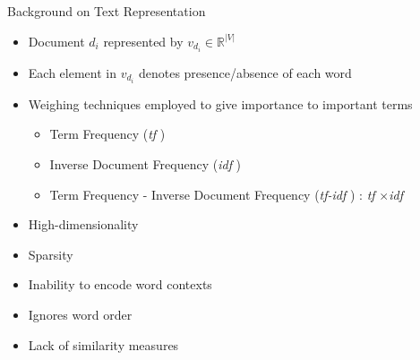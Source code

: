 \documentclass[10pt]{beamer}
\newcommand{\todo}[1]{\textcolor{red}{\textbf{TODO:} #1}}
\begin{document}
\begin{frame}{Background on Text Representation}
\vfill
{}
\begin{itemize}
	\vfill\item<1-> Document $d_{i}$ represented by $v_{d_{i}} \in \mathbb{R}^{|V|}$
	\vfill\item<1-> Each element in $v_{d_{i}}$ denotes presence/absence of each word
	\vfill\item<1-> Weighing techniques employed to give importance to important terms
	\begin{itemize}
		\vfill\item<1-> Term Frequency (\emph{tf} )
		\vfill\item<1-> Inverse Document Frequency (\emph{idf} )
		\vfill\item<1-> Term Frequency - Inverse Document Frequency (\emph{tf-idf} ) : \emph{tf} $\times$\emph{idf}
	\end{itemize}
\end{itemize}
\vfill
{}
\begin{itemize}
	\vfill\item<2-> High-dimensionality
	\vfill\item<2-> Sparsity
	\vfill\item<2-> Inability to encode word contexts
	\vfill\item<2-> Ignores word order
	\vfill\item<2-> Lack of similarity measures
\end{itemize}
\vfill
\end{frame}

\end{document}
